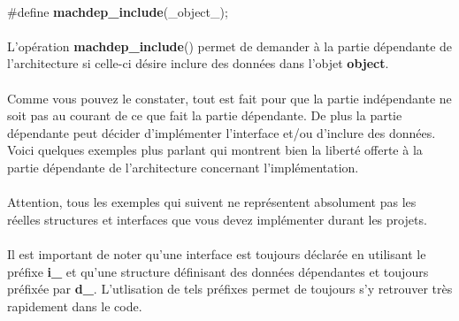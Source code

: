 \documentclass[10pt,a4wide]{article}
\begin{document}
\paragraph{}

\hspace{1.5cm}\#define \textbf{machdep\_include}(\_object\_);

\paragraph{}

L'op\'eration \textbf{machdep\_include}() permet de demander \`a la partie
d\'ependante de l'architecture si celle-ci d\'esire inclure des donn\'ees
dans l'objet \textbf{object}.

\paragraph{}

Comme vous pouvez le constater, tout est fait pour que la partie ind\'ependante
ne soit pas au courant de ce que fait la partie d\'ependante. De plus
la partie d\'ependante peut d\'ecider d'impl\'ementer l'interface
et/ou d'inclure des donn\'ees. Voici quelques exemples plus parlant
qui montrent bien la libert\'e offerte \`a la partie d\'ependante
de l'architecture concernant l'impl\'ementation.

\paragraph{}

Attention, tous les exemples qui suivent ne repr\'esentent absolument
pas les r\'eelles structures et interfaces que vous devez impl\'ementer
durant les projets.

\paragraph{}

Il est important de noter qu'une interface est toujours d\'eclar\'ee en
utilisant le pr\'efixe \textbf{i\_} et qu'une structure d\'efinisant
des donn\'ees d\'ependantes et toujours pr\'efix\'ee par \textbf{d\_}.
L'utlisation de tels pr\'efixes permet de toujours s'y retrouver
tr\`es rapidement dans le code.

\paragraph{}
\end{document}
